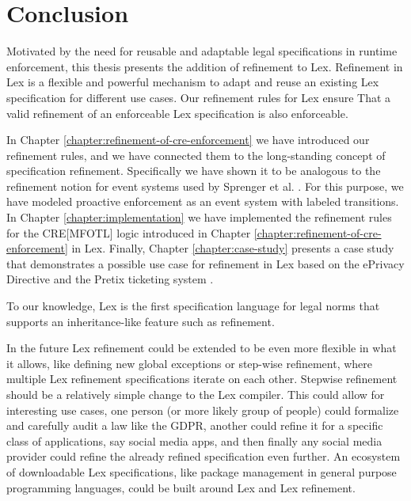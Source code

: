 \chapter{Conclusion}
\label{chapter:conclusion}

Motivated by the need for reusable and adaptable legal
specifications in runtime enforcement,
this thesis presents the addition of refinement to Lex.
Refinement in Lex is a flexible and powerful mechanism to
adapt and reuse an existing Lex specification
for different use cases.
Our refinement rules for Lex ensure That
a valid refinement of an enforceable Lex
specification is also enforceable.

In Chapter \ref{chapter:refinement-of-cre-enforcement}
we have introduced our refinement rules, and we have
connected them to the long-standing concept of
specification refinement.
Specifically we have shown it to be analogous to the
refinement notion for event systems used by Sprenger
et al. \cite{igloo}.
For this purpose, we have modeled proactive
enforcement as an event system with labeled transitions.
In Chapter \ref{chapter:implementation} we
have implemented the refinement rules for the CRE[MFOTL] logic
introduced in Chapter \ref{chapter:refinement-of-cre-enforcement}
in Lex.
Finally, Chapter \ref{chapter:case-study} presents a case study
that demonstrates a possible use case for refinement in Lex
based on the ePrivacy Directive \cite{EPD2002}
and the Pretix ticketing system \cite{PretixReinventingTicket}.

To our knowledge, Lex is the first specification language
for legal norms that supports an inheritance-like feature
such as refinement.

In the future Lex refinement could be extended to be even more
flexible in what it allows, like defining new global exceptions
or step-wise refinement, where multiple Lex refinement specifications
iterate on each other.
Stepwise refinement should be a relatively simple change
to the Lex compiler.
This could allow for interesting use cases,
one person (or more likely group of people) could formalize
and carefully audit a law like the GDPR, another
could refine it for a specific class of applications,
say social media apps, and then finally any social media
provider could refine the already refined specification
even further.
An ecosystem of downloadable Lex specifications,
like package management in general purpose programming languages,
could be built around Lex and Lex refinement.

